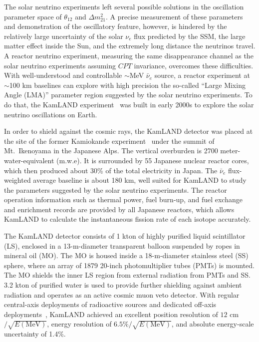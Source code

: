 \documentclass[aps,twocolumn,preprintnumbers,amsmath,superscriptaddress,amssymb,floats,nofootinbib]{revtex4-1}
\begin{document}
The solar neutrino experiments left several possible solutions in the oscillation parameter space of $\theta_{12}$ and $\Delta m^2_{21}$. 
A precise measurement of these parameters and demonstration of the oscillatory feature, however, is hindered by the relatively large uncertainty of the solar $\nu_{e}$ flux predicted by the SSM, the large matter effect inside the Sun, and the extremely long distance the neutrinos travel. 
A reactor neutrino experiment, measuring the same disappearance channel as the solar neutrino experiments assuming $CPT$ invariance, overcomes these difficulties. 
With well-understood and controllable $\sim$MeV $\bar\nu_e$ source, a reactor experiment at $\sim$100 km baselines can explore with high precision the so-called ``Large Mixing Angle (LMA)'' parameter region suggested by the solar neutrino experiments. To do that, the KamLAND experiment~\cite{Kamland03} was built in early 2000s to explore the solar neutrino oscillations on Earth.

In order to shield against the cosmic rays, the KamLAND detector was placed at the site of the former Kamiokande experiment~\cite{Kamiokande} under the summit of Mt.~Ikenoyama in the Japanese Alps. 
The vertical overburden is 2700 meter-water-equivalent (m.w.e). 
It is surrounded by 55 Japanese nuclear reactor cores, which then produced about 30\% of the total electricity in Japan. 
The $\bar\nu_e$ flux-weighted average baseline is about 180 km, well suited for KamLAND to study the parameters suggested by the solar neutrino experiments. 
The reactor operation information such as thermal power, fuel burn-up, and fuel exchange and enrichment records are provided by all Japanese reactors, which allows KamLAND to calculate the instantaneous fission rate of each isotope accurately. 

The KamLAND detector consists of 1 kton of highly purified liquid scintillator (LS), enclosed in a 13-m-diameter transparent balloon suspended by ropes in mineral oil (MO). 
The MO is housed inside a 18-m-diameter stainless steel (SS) sphere, where an array of 1879 20-inch photomultiplier tubes (PMTs) is mounted. 
The MO shields the inner LS region from external radiation from PMTs and SS. 
3.2 kton of purified water is used to provide further shielding against ambient radiation and operates as an active cosmic muon veto detector. 
With regular central-axis deployments of radioactive sources and dedicated off-axis deployments~\cite{KamLAND-4pi}, KamLAND achieved an excellent position resolution of $12$ cm$/\sqrt{E(\textrm{MeV})}$, energy resolution of $6.5\%/\sqrt{E(\textrm{MeV})}$, and absolute energy-scale uncertainty of 1.4\%.
\end{document}
